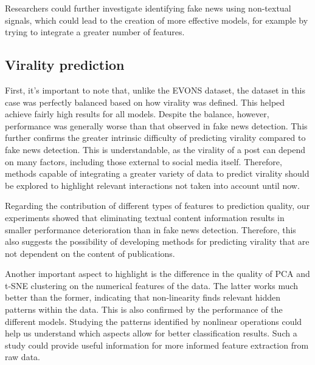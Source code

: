 \documentclass[a4paper,twoside,12pt]{book}
\begin{document}
Researchers could further investigate identifying fake news using non-textual signals, which could lead to the creation of more effective models, for example by trying to integrate a greater number of features.

\subsection{Virality prediction}

First, it's important to note that, unlike the EVONS dataset, the dataset in this case was perfectly balanced based on how virality was defined. This helped achieve fairly high results for all models. Despite the balance, however, performance was generally worse than that observed in fake news detection. This further confirms the greater intrinsic difficulty of predicting virality compared to fake news detection. This is understandable, as the virality of a post can depend on many factors, including those external to social media itself. Therefore, methods capable of integrating a greater variety of data to predict virality should be explored to highlight relevant interactions not taken into account until now.

Regarding the contribution of different types of features to prediction quality, our experiments showed that eliminating textual content information results in smaller performance deterioration than in fake news detection. Therefore, this also suggests the possibility of developing methods for predicting virality that are not dependent on the content of publications.

Another important aspect to highlight is the difference in the quality of PCA and t-SNE clustering on the numerical features of the data. The latter works much better than the former, indicating that non-linearity finds relevant hidden patterns within the data. This is also confirmed by the performance of the different models. Studying the patterns identified by nonlinear operations could help us understand which aspects allow for better classification results. Such a study could provide useful information for more informed feature extraction from raw data. \\
\end{document}
